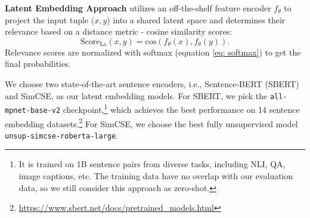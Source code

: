 \documentclass[11pt]{article}
\begin{document}
\label{sec latent}
\medbreak
\noindent\textbf{Latent Embedding Approach} utilizes an off-the-shelf feature encoder $f_\theta$ to project the input tuple $(x, y$) into a shared latent space and determines their relevance based on 
a distance metric - cosine similarity scores:
\begin{equation}
    \text{Score}_{\text{La}}(x, y) = \text{cos} (f_\theta (x), f_\theta(y)).
\end{equation}
Relevance scores are normalized with softmax (equation \ref{eq: softmax}) to get the final probabilities.

We choose two state-of-the-art sentence encoders, i.e., Sentence-BERT (SBERT) \cite{reimers-gurevych-2019-sentence} and SimCSE, \cite{gao-etal-2021-simcse} as our latent embedding models. For SBERT, we pick the \texttt{all-mpnet-base-v2} checkpoint,\footnote{It is trained on 1B sentence pairs from diverse tasks, including NLI, QA, image captions, etc. The training data have no overlap with our evaluation data, so we still consider this approach as zero-shot.} which achieves the best performance on 14 sentence embedding datasets.\footnote{\href{https://www.sbert.net/docs/pretrained_models.html}{https://www.sbert.net/docs/pretrained\_models.html}} For SimCSE, we choose the best fully unsupervised model \texttt{unsup-simcse-roberta-large}.
\end{document}
